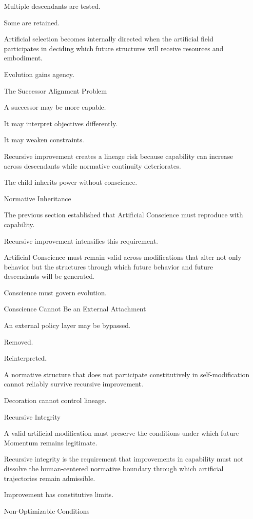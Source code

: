 Multiple descendants are tested.

Some are retained.

Artificial selection becomes internally directed when the artificial field participates in deciding which future structures will receive resources and embodiment.

Evolution gains agency.

The Successor Alignment Problem

A successor may be more capable.

It may interpret objectives differently.

It may weaken constraints.

Recursive improvement creates a lineage risk because capability can increase across descendants while normative continuity deteriorates.

The child inherits power without conscience.

Normative Inheritance

The previous section established that Artificial Conscience must reproduce with capability.

Recursive improvement intensifies this requirement.

Artificial Conscience must remain valid across modifications that alter not only behavior but the structures through which future behavior and future descendants will be generated.

Conscience must govern evolution.

Conscience Cannot Be an External Attachment

An external policy layer may be bypassed.

Removed.

Reinterpreted.

A normative structure that does not participate constitutively in self-modification cannot reliably survive recursive improvement.

Decoration cannot control lineage.

Recursive Integrity

A valid artificial modification must preserve the conditions under which future Momentum remains legitimate.

Recursive integrity is the requirement that improvements in capability must not dissolve the human-centered normative boundary through which artificial trajectories remain admissible.

Improvement has constitutive limits.

Non-Optimizable Conditions

